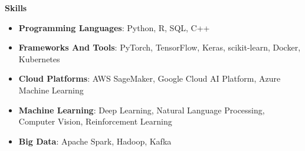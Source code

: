 \documentclass[10pt]{article}
\begin{document}
    \vspace{10pt}
    \noindent \textbf{Skills}
    \begin{itemize}[leftmargin=0.2in]
    
        \item \textbf{Programming Languages}: Python, R, SQL, C++

        \item \textbf{Frameworks And Tools}: PyTorch, TensorFlow, Keras, scikit-learn, Docker, Kubernetes

        \item \textbf{Cloud Platforms}: AWS SageMaker, Google Cloud AI Platform, Azure Machine Learning

        \item \textbf{Machine Learning}: Deep Learning, Natural Language Processing, Computer Vision, Reinforcement Learning

        \item \textbf{Big Data}: Apache Spark, Hadoop, Kafka
\end{itemize}\n
\end{document}
